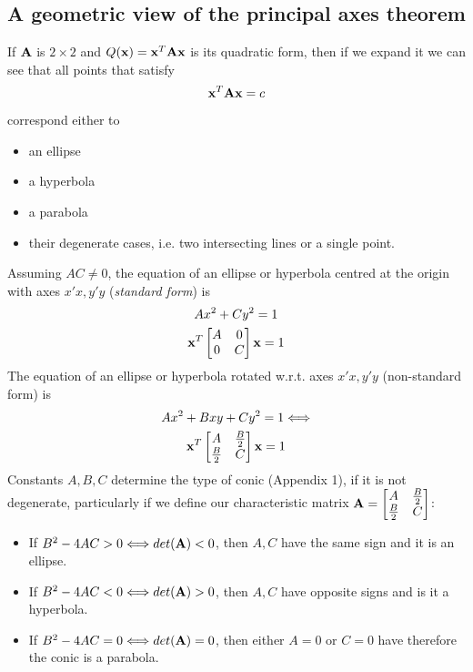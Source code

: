 \documentclass[a4paper]{article}
\numberwithin{equation}{section} %
\newcommand{\B}[1]{\textbf{\textup{#1}}} %
\begin{document}
\subsection{A geometric view of the principal axes theorem}
If $\textbf{\B{A}}$ is $2\times 2$ and $Q(\B{x})=\B{x}^{T}\B{Ax}$ is its quadratic form, then if we expand it we can see that all points that satisfy
\begin{equation}\label{eq:2:1}
  \B{x}^{T}\B{Ax}=c
\end{equation}
correspond either to
\begin{itemize}
  \item an ellipse
  \item a hyperbola
  \item a parabola
  \item their degenerate cases, i.e. two intersecting lines or a single point.
\end{itemize}
Assuming $AC \neq 0$, the equation of an ellipse or hyperbola centred at the origin with axes $x'x, y'y$ (\textit{standard form}) is
\begin{equation}
	\begin{gathered}
		Ax^2+Cy^2=1\\
		\B{x}^{T}\begin{bmatrix}A & 0 \\ 0 & C \end{bmatrix}\B{x}=1
	\end{gathered}
\end{equation}
The equation of an ellipse or hyperbola rotated w.r.t. axes $x'x, y'y$ (non-standard form) is
\begin{equation}
	\begin{gathered}
	Ax^2+Bxy+Cy^2=1 \Longleftrightarrow \\
    \B{x}^{T}\begin{bmatrix}A & \tfrac{B}{2}\\\tfrac{B}{2} & C \end{bmatrix}\B{x}=1
	\end{gathered}
    \label{eq:ellipse_non_standard}
\end{equation}
Constants $A, B, C$ determine the type of conic (Appendix 1), if it is not degenerate, particularly if we define our characteristic matrix $\B{A}=\begin{bmatrix}A & \tfrac{B}{2}\\\tfrac{B}{2} & C\end{bmatrix}$:
\begin{itemize}
	\item If $B^2-4AC>0 \Longleftrightarrow det(\B{A})<0$, then $A,C$ have the same sign and it is an ellipse.
    \item If $B^2-4AC<0\Longleftrightarrow det(\B{A})>0$, then $A,C$ have opposite signs and is it a hyperbola.
    \item If $B^2-4AC=0\Longleftrightarrow det(\B{A})=0$, then either $A=0$ or $C=0$ have therefore the conic is a parabola.
\end{itemize}
\end{document}
